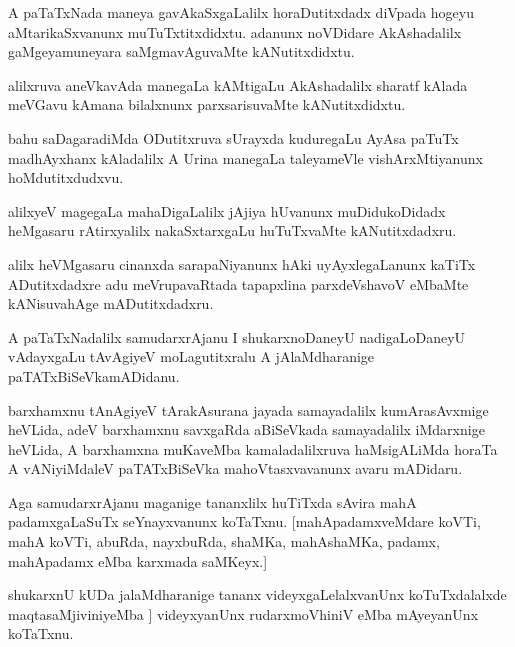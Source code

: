 \documentclass{article}
\begin{document}
\begin{mn}%
A paTaTxNada maneya gavAkaSxgaLalilx horaDutitxdadx diVpada hogeyu aMtarikaSxvanunx 
muTuTxtitxdidxtu. adanunx noVDidare AkAshadalilx gaMgeyamuneyara saMgmavAguvaMte 
kANutitxdidxtu.
\end{mn}

\begin{mn}%
alilxruva aneVkavAda manegaLa kAMtigaLu AkAshadalilx sharatf kAlada meVGavu kAmana 
bilalxnunx parxsarisuvaMte kANutitxdidxtu.
\end{mn}

\begin{mn}%
bahu saDagaradiMda ODutitxruva sUrayxda kuduregaLu AyAsa paTuTx madhAyxhanx kAladalilx A 
Urina manegaLa taleyameVle vishArxMtiyanunx hoMdutitxdudxvu.
\end{mn}

\begin{mn}%
alilxyeV magegaLa mahaDigaLalilx jAjiya hUvanunx muDidukoDidadx heMgasaru rAtirxyalilx 
nakaSxtarxgaLu huTuTxvaMte kANutitxdadxru.
\end{mn}

\begin{mn}%
alilx heVMgasaru cinanxda sarapaNiyanunx hAki uyAyxlegaLanunx kaTiTx ADutitxdadxre adu 
meVrupavaRtada tapapxlina parxdeVshavoV eMbaMte kANisuvahAge mADutitxdadxru.
\end{mn}

\begin{mn}%
A paTaTxNadalilx samudarxrAjanu I shukarxnoDaneyU nadigaLoDaneyU vAdayxgaLu tAvAgiyeV 
moLagutitxralu A jAlaMdharanige paTATxBiSeVkamADidanu.
\end{mn}

\begin{mn}%
barxhamxnu tAnAgiyeV tArakAsurana jayada samayadalilx kumArasAvxmige heVLida, adeV 
barxhamxnu savxgaRda aBiSeVkada samayadalilx iMdarxnige heVLida, A barxhamxna muKaveMba 
kamaladalilxruva haMsigALiMda horaTa A vANiyiMdaleV paTATxBiSeVka mahoVtasxvavanunx avaru 
mADidaru.
\end{mn}

\begin{mn}%
Aga samudarxrAjanu maganige tananxlilx huTiTxda sAvira mahA padamxgaLaSuTx seYnayxvanunx 
koTaTxnu. [mahApadamxveMdare koVTi, mahA koVTi, abuRda, nayxbuRda, shaMKa, mahAshaMKa, 
padamx, mahApadamx eMba karxmada saMKeyx.]
\end{mn}

\begin{mn}%
shukarxnU kUDa jalaMdharanige tananx videyxgaLelalxvanUnx koTuTxdalalxde maqtasaMjiviniyeMba ]
videyxyanUnx rudarxmoVhiniV eMba mAyeyanUnx koTaTxnu.
\end{mn}
\end{document}
